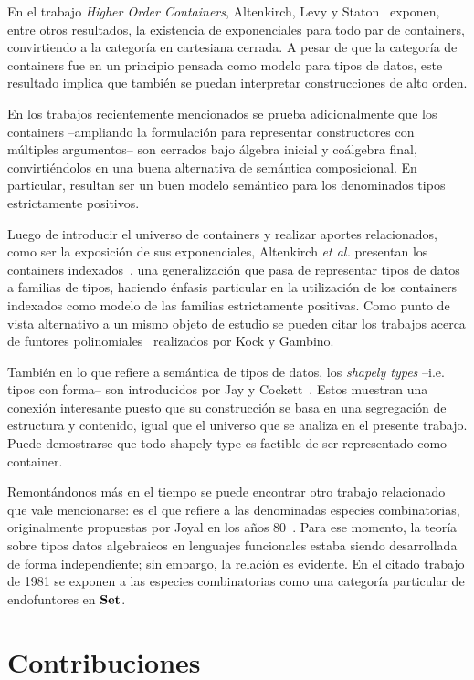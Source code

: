 En el trabajo {\it Higher Order Containers}, Altenkirch, Levy y Staton~\cite{alti:2010} exponen, entre otros resultados, la existencia de exponenciales para todo par de containers, convirtiendo a la categoría en cartesiana cerrada. A pesar de que la categoría de containers fue en un principio pensada como modelo para tipos de datos, este resultado implica que también se puedan interpretar construcciones de alto orden. 

En los trabajos recientemente mencionados se prueba adicionalmente que los containers --ampliando la formulación para representar constructores con múltiples argumentos-- son cerrados bajo álgebra inicial y coálgebra final, convirtiéndolos en una buena alternativa de semántica composicional. En particular, resultan ser un buen modelo semántico para los denominados tipos estrictamente positivos.

Luego de introducir el universo de containers y realizar aportes relacionados, como ser la exposición de sus exponenciales, Altenkirch {\it et al.} presentan los containers indexados~\cite{alti:2015}, una generalización que pasa de representar tipos de datos a familias de tipos, haciendo énfasis particular en la utilización de los containers indexados como modelo de las familias estrictamente positivas. Como punto de vista alternativo a un mismo objeto de estudio se pueden citar los trabajos acerca de funtores polinomiales~\cite{kock2010} realizados por Kock y Gambino.

También en lo que refiere a semántica de tipos de datos, los {\it shapely types} --i.e. tipos con forma-- son introducidos por Jay y Cockett~\cite{jay94,jay95}. Estos muestran una conexión interesante puesto que su construcción se basa en una segregación de estructura y contenido, igual que el universo que se analiza en el presente trabajo. Puede demostrarse que todo shapely type es factible de ser representado como container.

Remontándonos más en el tiempo se puede encontrar otro trabajo relacionado que vale mencionarse: es el que refiere a las denominadas especies combinatorias, originalmente propuestas por Joyal en los años 80~\cite{joyal1981}. Para ese momento, la teoría sobre tipos datos algebraicos en lenguajes funcionales estaba siendo desarrollada de forma independiente; sin embargo, la relación es evidente. En el citado trabajo de 1981 se exponen a las especies combinatorias como una categoría particular de endofuntores en $\mathbf{Set}$.


\section*{Contribuciones}


